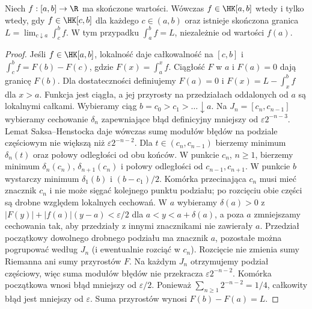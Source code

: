\begin{twierdzenie}\label{ma1:kh:thm:kh-hake}\label{it:thm:kh-hake}
Niech $f:[a,b]\to\R$ ma skończone wartości. Wówczas $f\in\HK[a,b]$ wtedy i tylko wtedy, gdy $f\in\HK[c,b]$ dla każdego $c\in(a,b)$ oraz istnieje skończona granica $L=\lim_{c\downarrow a}\int_c^b f$. W tym przypadku $\int_a^b f=L$, niezależnie od wartości $f(a)$.
\end{twierdzenie}
\begin{proof}
Jeśli $f\in\HK[a,b]$, lokalność daje całkowalność na $[c,b]$ i $\int_c^b f=F(b)-F(c)$, gdzie $F(x)=\int_a^x f$. Ciągłość $F$ w $a$ i $F(a)=0$ dają granicę $F(b)$. Dla dostateczności definiujemy $F(a)=0$ i $F(x)=L-\int_x^b f$ dla $x>a$. Funkcja jest ciągła, a jej przyrosty na przedziałach oddalonych od $a$ są lokalnymi całkami. Wybieramy ciąg $b=c_0>c_1>\dots\downarrow a$. Na $J_n=[c_n,c_{n-1}]$ wybieramy cechowanie $\delta_n$ zapewniające błąd definicyjny mniejszy od $\varepsilon2^{-n-3}$. Lemat Saksa--Henstocka daje wówczas sumę modułów błędów na podziale częściowym nie większą niż $\varepsilon2^{-n-2}$. Dla $t\in(c_n,c_{n-1})$ bierzemy minimum $\delta_n(t)$ oraz połowy odległości od obu końców. W punkcie $c_n$, $n\ge1$, bierzemy minimum $\delta_n(c_n)$, $\delta_{n+1}(c_n)$ i połowy odległości od $c_{n-1},c_{n+1}$. W punkcie $b$ wystarczy minimum $\delta_1(b)$ i $(b-c_1)/2$. Komórka przecinająca $c_n$ musi mieć znacznik $c_n$ i nie może sięgać kolejnego punktu podziału; po rozcięciu obie części są drobne względem lokalnych cechowań. W $a$ wybieramy $\delta(a)>0$ z $|F(y)|+|f(a)|(y-a)<\varepsilon/2$ dla $a<y<a+\delta(a)$, a poza $a$ zmniejszamy cechowania tak, aby przedziały z innymi znacznikami nie zawierały $a$. Przedział początkowy dowolnego drobnego podziału ma znacznik $a$, pozostałe można pogrupować według $J_n$ (i ewentualnie rozciąć w $c_n$). Rozcięcie nie zmienia sumy Riemanna ani sumy przyrostów $F$. Na każdym $J_n$ otrzymujemy podział częściowy, więc suma modułów błędów nie przekracza $\varepsilon2^{-n-2}$. Komórka początkowa wnosi błąd mniejszy od $\varepsilon/2$. Ponieważ $\sum_{n\ge1}2^{-n-2}=1/4$, całkowity błąd jest mniejszy od $\varepsilon$. Suma przyrostów wynosi $F(b)-F(a)=L$.
\end{proof}
